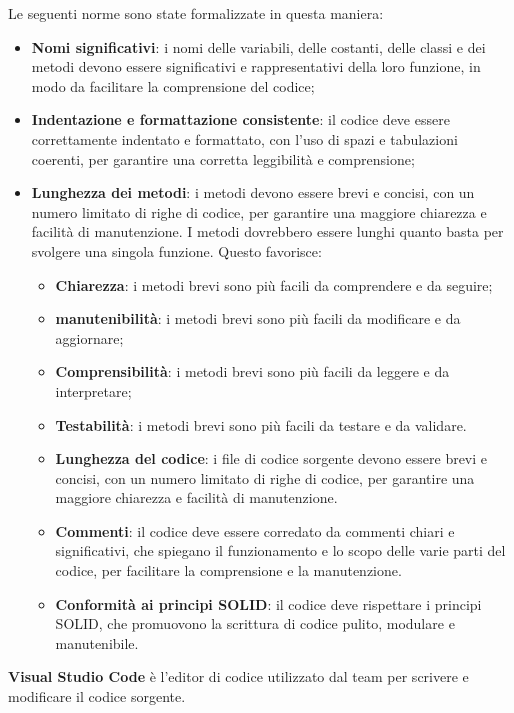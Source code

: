 Le seguenti norme sono state formalizzate in questa maniera:
\begin{itemize}
	\item \textbf{Nomi significativi}: i nomi delle variabili, delle costanti, delle classi e dei metodi devono essere significativi e rappresentativi della loro funzione, in modo da facilitare la comprensione del codice;
	\item \textbf{Indentazione e formattazione consistente}: il codice deve essere correttamente indentato e formattato, con l'uso di spazi e tabulazioni coerenti, per garantire una corretta leggibilità e comprensione;
	\item \textbf{Lunghezza dei metodi}: i metodi devono essere brevi e concisi, con un numero limitato di righe di codice, per garantire una maggiore chiarezza e facilità di manutenzione. I metodi dovrebbero essere lunghi quanto basta per svolgere una singola funzione. Questo favorisce:
	\begin{itemize}
		\item \textbf{Chiarezza}: i metodi brevi sono più facili da comprendere e da seguire;
		\item \textbf{manutenibilità}: i metodi brevi sono più facili da modificare e da aggiornare;
		\item \textbf{Comprensibilità}: i metodi brevi sono più facili da leggere e da interpretare;
		\item \textbf{Testabilità}: i metodi brevi sono più facili da testare e da validare.
		\item \textbf{Lunghezza del codice}: i file di codice sorgente devono essere brevi e concisi, con un numero limitato di righe di codice, per garantire una maggiore chiarezza e facilità di manutenzione.
		\item \textbf{Commenti}: il codice deve essere corredato da commenti chiari e significativi, che spiegano il funzionamento e lo scopo delle varie parti del codice, per facilitare la comprensione e la manutenzione.
		\item \textbf{Conformità ai principi SOLID}: il codice deve rispettare i principi SOLID, che promuovono la scrittura di codice pulito, modulare e manutenibile.
	\end{itemize}
\end{itemize}

\textbf{Visual Studio Code} è l'editor di codice utilizzato dal team per scrivere e modificare il codice sorgente.


